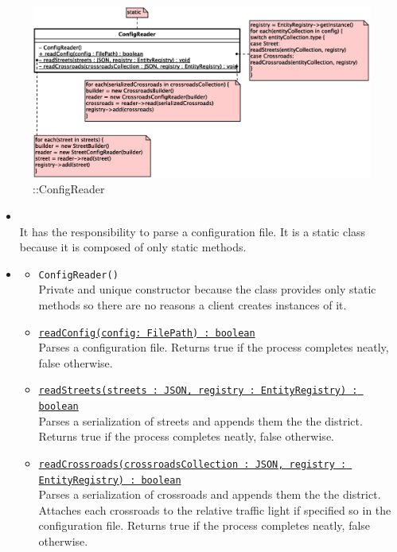 \begin{figure}[h]
\centering
\includegraphics[scale=0.6,keepaspectratio]{images/solution/app/backend/config_reader.eps}
\caption{\pReactive::ConfigReader}
\label{fig:sd-app-district-starter}
\end{figure}
\FloatBarrier
\begin{itemize}
  \item \textbf{\descr} \\
  It has the responsibility to parse a configuration file.
  It is a static class because it is composed of only static methods.
  \item \textbf{\ops}
  \begin{itemize}
    \item \texttt{ConfigReader()} \\
    Private and unique constructor because the class provides only static methods 
    so there are no reasons a client creates instances of it.
    \item \texttt{\underline{readConfig(config: FilePath) : boolean}} \\
    Parses a configuration file.
    Returns true if the process completes neatly, false otherwise.
    \item \texttt{\underline{readStreets(streets : JSON, registry : EntityRegistry) : boolean}} \\
    Parses a serialization of streets and appends them the the district.
    Returns true if the process completes neatly, false otherwise.
    \item \texttt{\underline{readCrossroads(crossroadsCollection : JSON, registry : EntityRegistry) : boolean}} \\
    Parses a serialization of crossroads and appends them the the district.
    Attaches each crossroads to the relative traffic light
    if specified so in the configuration file. 
    Returns true if the process completes neatly, false otherwise.
  \end{itemize}
\end{itemize}
